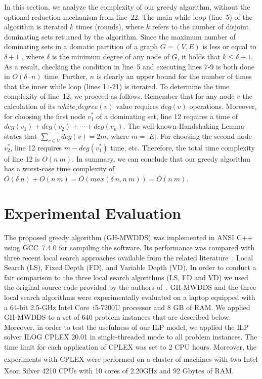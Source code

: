 \documentclass[algorithms,article,accept,moreauthors,pdftex]{Definitions/mdpi}
\begin{document}
In this section, we analyze the complexity of our greedy algorithm, without the optional reduction mechanism from line~22. The main while loop (line~5) of the algorithm is iterated $k$ times (rounds), where $k$ refers to the number of disjoint dominating sets returned by the algorithm. Since the maximum number of dominating sets in a domatic partition of a graph $G=(V,E)$ is less or equal to $\delta +1$ \cite{feige2002approximating}, where $\delta$ is the minimum degree of any node of $G$, it holds that $k \leq \delta +1$. As a result, checking the condition in line~5 and executing lines 7-9 is both done in $O(\delta\cdot n)$ time. Further, $n$ is clearly an upper bound for the number of times that the inner while loop (lines 11-21) is iterated. To determine the time complexity of line~12, we proceed as follows. Remember that for any node $v$ the calculation of its $white\_degree(v)$ value requires $deg(v)$ operations. Moreover, for choosing the first node $v^{*}_{1}$ of a dominating set, line 12 requires a time of $deg(v_{1})+ deg(v_{2})+ \cdots + deg(v_{n})$. The well-known Handshaking Lemma states that $\sum\limits_{v \in V} { deg(v)} = 2 m$, where $m = |E|$. For choosing the second node $v^{*}_{2}$, line 12 requires  $m - deg(v^{*}_{1})$ time, etc. Therefore, the total time complexity of line 12 is $O(n\ m)$. In summary, we can conclude that our greedy algorithm has a worst-case time complexity of $O(\delta\ n)+ O(n\ m)= O ( max(\delta\ n, n\ m)) = O(n\ m) $.

\section{Experimental Evaluation}
\label{sec:experiments}

The proposed greedy algorithm (GH-MWDDS) was implemented in ANSI C++ using  GCC~7.4.0 for compiling the software. Its performance was compared with three recent local search approaches available from the related literature~\cite{pino2018:dominating}: Local Search (LS), Fixed Depth (FD), and Variable Depth (VD). In order to conduct a fair comparison to the three local search algorithms (LS, FD and VD) we used the original source code provided by the authors of~\cite{pino2018:dominating}. GH-MWDDS and the three local search algorithms were experimentally evaluated on a laptop equipped with a 64-bit 2.5-GHz Intel{\textregistered} Core\texttrademark ~i5-7200U processor and 8 GB of RAM. We applied GH-MWDDS to a set of 640 problem instances that are described below. Moreover, in order to test the usefulness of our ILP model, we applied the ILP solver ILOG CPLEX 20.01 in single-threaded mode to all problem instances. The time limit for each application of CPLEX was set to 2 CPU hours. Moreover, the experiments with CPLEX were performed on a cluster of machines with two Intel\textsuperscript{\textregistered} Xeon\textsuperscript{\textregistered} Silver 4210 CPUs with 10 cores of 2.20GHz and 92 Gbytes of RAM.
\end{document}

